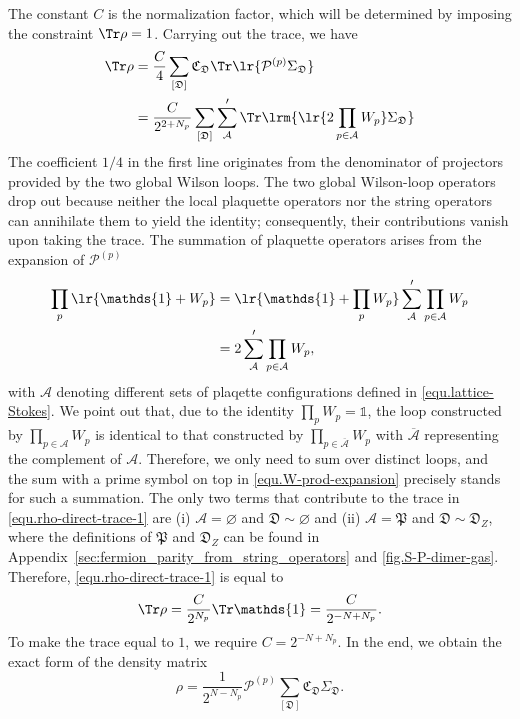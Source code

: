 The constant $C$ is the normalization factor, which will be determined by imposing the constraint $\Tr\rho = 1$. Carrying out the trace, we have 
\begin{align}\label{equ.rho-direct-trace-1}
    \Tr\rho &= \frac{C}{4} \sum_{[\mathfrak{D}]} \mathfrak{C}_{\mathfrak{D}} \Tr\lr{\mathcal{P}^{(p)}\Sigma_{\mathfrak{D}}} \nonumber\\
    &= \frac{C}{2^{2+N_p}} \sum_{[\mathfrak{D}]} \sum_{\mathcal{A}}'\Tr\lrm{ \lr{2\prod_{p\in\mathcal{A}} W_p}\Sigma_{\mathfrak{D}}}
\end{align}
The coefficient $1/4$ in the first line originates from the denominator of projectors provided by the two global Wilson loops. The two global Wilson-loop operators drop out because neither the local plaquette operators nor the string operators can annihilate them to yield the identity; consequently, their contributions vanish upon taking the trace. The summation of plaquette operators arises from the expansion of $\mathcal{P}^{(p)}$
\begin{align}\label{equ.W-prod-expansion}
    \prod_{p}\lr{\mathds{1}+W_p} &= \lr{\mathds{1}+\prod_{p}W_p}\sum'_{\mathcal{A}}\prod_{p\in\mathcal{A}}W_p \nonumber\\
    &= 2\sum'_{\mathcal{A}}\prod_{p\in\mathcal{A}}W_p,
\end{align}
with $\mathcal{A}$ denoting different sets of plaqette configurations defined in \eqref{equ.lattice-Stokes}. We point out that, due to the identity $\prod_{p}W_p=\mathds{1}$, the loop constructed by $\prod_{p\in \mathcal{A}}W_p$ is identical to that constructed by $\prod_{p\in \overline{\mathcal{A}}}W_p$ with $\overline{\mathcal{A}}$ representing the complement of $\mathcal{A}$. Therefore, we only need to sum over distinct loops, and the sum with a prime symbol on top in \eqref{equ.W-prod-expansion} precisely stands for such a summation. The only two terms that contribute to the trace in \eqref{equ.rho-direct-trace-1} are (i) $\mathcal{A}=\varnothing$ and $\mathfrak{D}\sim \varnothing$ and (ii) $\mathcal{A}=\mathfrak{P}$ and $\mathfrak{D}\sim\mathfrak{D}_Z$, where the definitions of $\mathfrak{P}$ and $\mathfrak{D}_Z$ can be found in Appendix~\ref{sec:fermion_parity_from_string_operators} and \autoref{fig.S-P-dimer-gas}. Therefore, \eqref{equ.rho-direct-trace-1} is equal to 
\[
\Tr\rho = \frac{C}{2^{N_p}}\Tr\mathds{1} = \frac{C}{2^{-N+N_p}}.
\]
To make the trace equal to $1$, we require $C = 2^{-N+N_p}$. 
In the end, we obtain the exact form of the density matrix
\begin{equation}\label{equ.density-matrix}
    \rho =  \frac{1}{2^{N-N_p}}\mathcal{P}^{(p)}\sum_{[\mathfrak{D}]}\mathfrak{C}_{\mathfrak{D}}\Sigma_{\mathfrak{D}}.
\end{equation}

